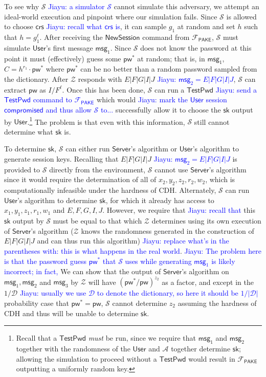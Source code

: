\documentclass[12pt,a4paper]{article}
\newcommand{\simulator}{\mathcal{S}}
\newcommand{\env}{\mathcal{Z}}
\newcommand{\adv}{\mathcal{A}}
\newcommand{\pake}{\mathcal{F}_{\mathsf{PAKE}}}
\newcommand{\user}{\mathsf{User}}
\newcommand{\sk}{\mathsf{sk}}
\newcommand{\pw}{\mathsf{pw}}
\newcommand{\crs}{\mathsf{crs}}
\newcommand{\newsession}{\mathsf{NewSession}}
\newcommand{\testpwd}{\mathsf{TestPwd}}
\newcommand{\compromised}{\mathsf{compromised}}
\newcommand{\server}{\mathsf{Server}}
\newcommand{\msg}[1]{\mathsf{msg}_{#1}}
\def\xjy#1{\textcolor{blue}{Jiayu: #1}}
\begin{document}
	To see why $\simulator$ \xjy{a simulator $\simulator$} cannot simulate this adversary, we attempt an ideal-world execution and pinpoint where our simulation fails. Since $\simulator$ is allowed to choose $\crs$ \xjy{recall what $\crs$ is}, it can sample $g_1$ at random and set $h$ such that $h=g_1^{\ell}$. After receiving the $\newsession$ command from $\pake$, $\simulator$ must simulate $\user$'s first message $\msg{1}$. Since $\simulator$ does not know the password at this point it must (effectively) guess some $\pw^*$ at random; that is, in $\msg{1}$, $C=h^{r_1}\cdot\pw^*$ where $\pw^*$ can be no better than a random password sampled from the dictionary. After $\env$ responds with $E|F|G|I|J$ \xjy{$\msg{2} = E|F|G|I|J$}, $\simulator$ can extract $\pw$ as $I/F^\ell$. Once this has been done, $\simulator$ can run a $\testpwd$ \xjy{send a $\testpwd$ command to $\pake$} which would \xjy{mark the $\user$ session $\compromised$ and thus allow $\simulator$ to...} successfully allow it to choose the $\sk$ output by $\user$.\footnote{Recall that a $\testpwd$ \textit{must} be run, since we require that $\msg{1}$ and $\msg{2}$ together with the randomness of the $\user$ and $\adv$ together determine $\sk$; allowing the simulation to proceed without a $\testpwd$ would result in $\pake$ outputting a uniformly random key.} The problem is that even with this information, $\simulator$ still cannot determine what $\sk$ is.
	
	To determine $\sk$, $\simulator$ can either run $\server$'s algorithm or $\user$'s algorithm to generate session keys. Recalling that $E|F|G|I|J$ \xjy{$\msg{2} = E|F|G|I|J$} is provided to $\simulator$ directly from the environment, $\simulator$ cannot use $\server$'s algorithm since it would require the determination of all of $x_2, y_2, z_2, r_2, w_2$, which is computationally infeasible under the hardness of CDH. Alternately, $\simulator$ can run $\user$'s algorithm to determine $\sk$, for which it already has access to $x_1,y_1,z_1,r_1,w_1$ and $E,F,G,I,J$. However, we require that \xjy{recall that} this $\sk$ output by $\simulator$ must be equal to that which $\env$ determines using its own execution of $\server$'s algorithm ($\env$ knows the randomness generated in the construction of $E|F|G|I|J$ and can thus run this algorithm) \xjy{replace what's in the parentheses with: this is what happens in the real world}. \xjy{The problem here is that the password guess $\pw^*$ that $\simulator$ uses while generating $\msg{1}$ is likely incorrect; in fact,} We can show that the output of $\server$'s algorithm on $\msg{1},\msg{2}$ and $\msg{3}$ by $\env$ will have $(\pw^{*}/\pw)^{z_2}$ as a factor, and except in the $1/\mathcal{D}$ \xjy{usually we use $\mathcal{D}$ to denote the dictionary, so here it should be $1/|\mathcal{D}|$} probability case that $\pw^*=\pw$, $\simulator$ cannot determine $z_2$ assuming the hardness of CDH and thus will be unable to determine $\sk$.\\
	
\end{document}

